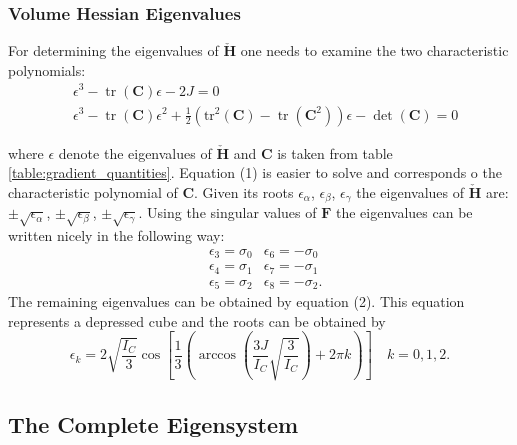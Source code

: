 
\subsubsection{Volume Hessian Eigenvalues}
For determining the eigenvalues of $\mathbf{\check{H}}$ one needs to examine the two characteristic polynomials:
\begin{align*}
&\epsilon^3 - \operatorname{tr}(\mathbf{C}) \epsilon - 2 J = 0 \tag{1}  \\
&\epsilon^3 - \operatorname{tr}(\mathbf{C}) \epsilon^2 + \frac{1}{2} \left( \operatorname{tr^2}(\mathbf{C}) - \operatorname{tr}(\mathbf{C}^2) \right) \epsilon - \operatorname{det}(\mathbf{C}) = 0 \tag{2}
\end{align*}

where $\epsilon$ denote the eigenvalues of $\mathbf{\check{H}}$ and $\mathbf{C}$ is taken from table \ref{table:gradient_quantities}. Equation (1) is easier to solve and corresponds o the characteristic polynomial of $\mathbf{C}$. Given its roots $\epsilon_\alpha$, $\epsilon_\beta$, $\epsilon_\gamma$ the eigenvalues of $\mathbf{\check{H}}$ are: $\pm \sqrt{\epsilon_\alpha}$, $\pm \sqrt{\epsilon_\beta}$, $\pm \sqrt{\epsilon_\gamma}$. Using the singular values of $\mathbf{F}$ the eigenvalues can be written nicely in the following way:
\begin{align*}
&\epsilon_3 = \sigma_0 &\epsilon_6 = -\sigma_0 \\
&\epsilon_4 = \sigma_1 &\epsilon_7 = -\sigma_1 \\
&\epsilon_5 = \sigma_2 &\epsilon_8 = -\sigma_2.
\end{align*}
The remaining eigenvalues can be obtained by equation (2). This equation represents a depressed cube and the roots can be obtained by
\[
\epsilon_k = 2 \sqrt{\frac{I_C}{3}} \operatorname{cos}\left[ \frac{1}{3} \left( \operatorname{arccos}\left(\frac{3 J}{I_C} \sqrt{\frac{3}{I_C}} \right) + 2 \pi k \right) \right] \quad  k= 0,1,2.
\]

 
\subsection{The Complete Eigensystem}

